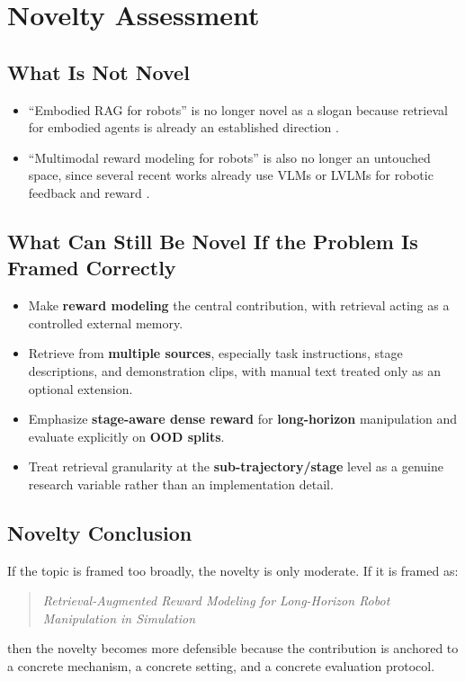 \section{Novelty Assessment}

\subsection{What Is Not Novel}

\begin{itemize}
  \item ``Embodied RAG for robots'' is no longer novel as a slogan because retrieval for embodied agents is already an established direction \citep{liu2024embodiedrag, li2025embodiedrag, xu2024raea}.
  \item ``Multimodal reward modeling for robots'' is also no longer an untouched space, since several recent works already use VLMs or LVLMs for robotic feedback and reward \citep{ma2024vlmfeedback, yang2025rgvlm, song2026roboreward}.
\end{itemize}

\subsection{What Can Still Be Novel If the Problem Is Framed Correctly}

\begin{itemize}
  \item Make \textbf{reward modeling} the central contribution, with retrieval acting as a controlled external memory.
  \item Retrieve from \textbf{multiple sources}, especially task instructions, stage descriptions, and demonstration clips, with manual text treated only as an optional extension.
  \item Emphasize \textbf{stage-aware dense reward} for \textbf{long-horizon} manipulation and evaluate explicitly on \textbf{OOD splits}.
  \item Treat retrieval granularity at the \textbf{sub-trajectory/stage} level as a genuine research variable rather than an implementation detail.
\end{itemize}

\subsection{Novelty Conclusion}

If the topic is framed too broadly, the novelty is only moderate.
If it is framed as:
\begin{quote}
  \textit{Retrieval-Augmented Reward Modeling for Long-Horizon Robot Manipulation in Simulation}
\end{quote}
then the novelty becomes more defensible because the contribution is anchored to
a concrete mechanism, a concrete setting, and a concrete evaluation protocol.

